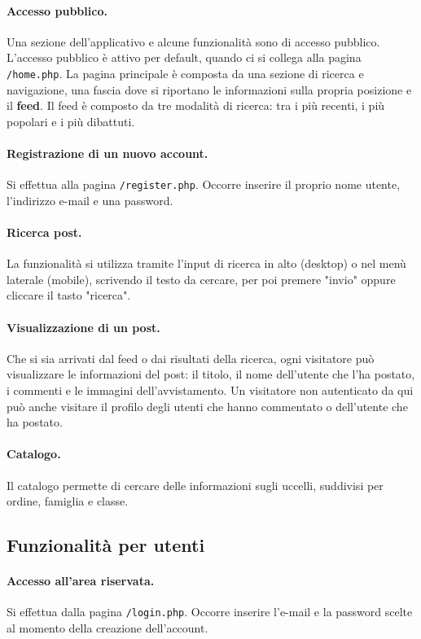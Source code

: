 \documentclass[12pt, a4paper]{article}
\begin{document}
\paragraph{Accesso pubblico.} Una sezione dell'applicativo e alcune funzionalità sono di accesso pubblico. L'accesso pubblico è attivo per default, quando ci si collega alla pagina \texttt{/home.php}. La pagina principale è composta da una sezione di ricerca e navigazione, una fascia dove si riportano le informazioni sulla propria posizione e il \textbf{feed}. Il feed è composto da tre modalità di ricerca: tra i più recenti, i più popolari e i più dibattuti.
\paragraph{Registrazione di un nuovo account.} Si effettua alla pagina \texttt{/register.php}. Occorre inserire il proprio nome utente, l'indirizzo e-mail e una password.
\paragraph{Ricerca post.} La funzionalità si utilizza tramite l'input di ricerca in alto (desktop) o nel menù laterale (mobile), scrivendo il testo da cercare, per poi premere "invio" oppure cliccare il tasto "ricerca".  
\paragraph{Visualizzazione di un post.} Che si sia arrivati dal feed o dai risultati della ricerca, ogni visitatore può visualizzare le informazioni del post: il titolo, il nome dell'utente che l'ha postato, i commenti e le immagini dell'avvistamento. Un visitatore non autenticato da qui può anche visitare il profilo degli utenti che hanno commentato o dell'utente che ha postato.
\paragraph{Catalogo.} Il catalogo permette di cercare delle informazioni sugli uccelli, suddivisi per ordine, famiglia e classe.
\subsection{Funzionalità per utenti}
\paragraph{Accesso all'area riservata.} 
Si effettua dalla pagina \texttt{/login.php}. Occorre inserire l'e-mail e la password scelte al momento della creazione dell'account. 
\end{document}
